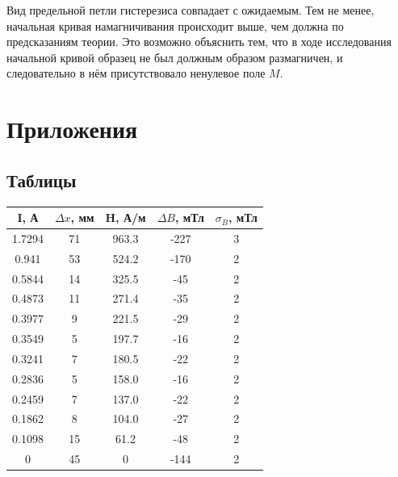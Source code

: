 \documentclass[14pt, a4paper,reqno]{article}
\begin{document}
        Вид предельной петли гистерезиса совпадает с ожидаемым. Тем не менее, начальная кривая намагничивания происходит
        выше, чем должна по предсказаниям теории. Это возможно объяснить тем, что в ходе исследования начальной кривой
        образец не был должным образом размагничен, и следовательно в нём присутствовало ненулевое поле $M$.

\newpage
\section{Приложения}

    \subsection{Таблицы}
    \begin{center}
        \begin{tabular}{|c|c|c|c|c|}
            \hline
            I, А     & $\Delta x$, мм & H, А/м   & $\Delta B$, мТл & $\sigma_B$, мТл    \\ \hline\hline
            1.7294   & 71             & 963.3	& -227            & 3  \\ \hline
            0.941    & 53             & 524.2	& -170            & 2  \\ \hline
            0.5844   & 14             & 325.5	& -45             & 2  \\ \hline
            0.4873   & 11             & 271.4	& -35             & 2  \\ \hline
            0.3977   & 9              & 221.5	& -29             & 2  \\ \hline
            0.3549   & 5              & 197.7	& -16             & 2  \\ \hline
            0.3241   & 7              & 180.5	& -22             & 2  \\ \hline
            0.2836   & 5              & 158.0	& -16             & 2  \\ \hline
            0.2459   & 7              & 137.0	& -22             & 2  \\ \hline
            0.1862   & 8              & 104.0	& -27             & 2  \\ \hline
            0.1098   & 15             & 61.2	& -48             & 2  \\ \hline
            0        & 45             & 0	    & -144            & 2  \\ \hline

\end{tabular}
\end{center}
\end{document}
